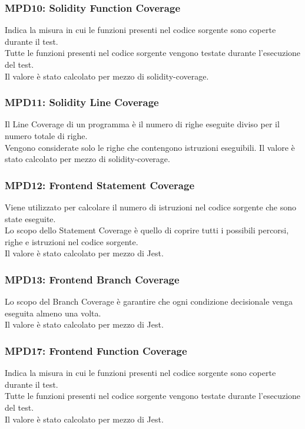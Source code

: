 \subsubsection{MPD10: Solidity Function Coverage}\label{sssec:solidity_function_coverage}
Indica la misura in cui le funzioni presenti nel codice sorgente sono coperte durante il test.\\
Tutte le funzioni presenti nel codice sorgente vengono testate durante l'esecuzione del test.\\
Il valore è stato calcolato per mezzo di solidity-coverage.

\subsubsection{MPD11: Solidity Line Coverage}\label{sssec:solidity_line_coverage}
Il Line Coverage di un programma è il numero di righe eseguite diviso per il numero totale di righe.\\
Vengono considerate solo le righe che contengono istruzioni eseguibili.
Il valore è stato calcolato per mezzo di solidity-coverage.

\subsubsection{MPD12: Frontend Statement Coverage}\label{sssec:frontend_statement_coverage}
Viene utilizzato per calcolare il numero di istruzioni nel codice sorgente che sono state eseguite.\\
Lo scopo dello Statement Coverage è quello di coprire tutti i possibili percorsi, righe e istruzioni nel codice sorgente.\\
Il valore è stato calcolato per mezzo di Jest.

\subsubsection{MPD13: Frontend Branch Coverage}\label{sssec:frontend_branch_coverage}
Lo scopo del Branch Coverage è garantire che ogni condizione decisionale venga eseguita almeno una volta.\\
Il valore è stato calcolato per mezzo di Jest.

\subsubsection{MPD17: Frontend Function Coverage}\label{sssec:frontend_function_coverage}
Indica la misura in cui le funzioni presenti nel codice sorgente sono coperte durante il test.\\
Tutte le funzioni presenti nel codice sorgente vengono testate durante l'esecuzione del test.\\
Il valore è stato calcolato per mezzo di Jest.

